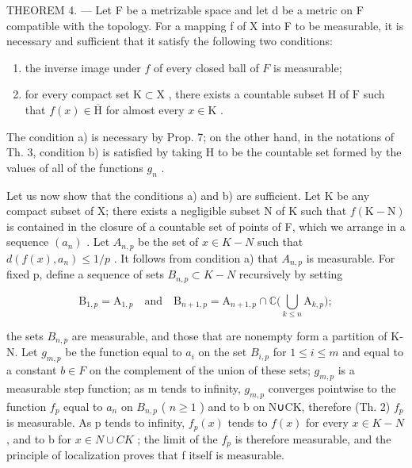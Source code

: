 THEOREM 4. --- Let F be a metrizable space and let d be a metric on F compatible with the topology. For a mapping f of X into F to be measurable, it is necessary and sufficient that it satisfy the following two conditions:

\begin{enumerate}
\def\labelenumi{\alph{enumi})}
\item
  the inverse image under \(f\) of every closed ball of \(F\) is measurable;
\item
  for every compact set \(\mathrm{K} \subset \mathrm{X}\) , there exists a countable subset \(\mathrm{H}\) of \(\mathrm{F}\) such that \(f(x) \in \overline{\mathrm{H}}\) for almost every \(x \in \mathrm{K}\) .
\end{enumerate}

The condition a) is necessary by Prop. 7; on the other hand, in the notations of Th. 3, condition b) is satisfied by taking H to be the countable set formed by the values of all of the functions \(g_{n}\) .

Let us now show that the conditions a) and b) are sufficient. Let K be any compact subset of X; there exists a negligible subset N of K such that \(f(\mathrm{K}-\mathrm{N})\) is contained in the closure of a countable set of points of F, which we arrange in a sequence \((a_{n})\) . Let \(A_{n,p}\) be the set of \(x \in K-N\) such that \(d(f(x), a_{n}) \leqslant 1/p\) . It follows from condition a) that \(A_{n,p}\) is measurable. For fixed p, define a sequence of sets \(B_{n,p} \subset K-N\) recursively by setting

\[
\mathrm{B} _ {1, p} = \mathrm{A} _ {1, p} \quad \text {and} \quad \mathrm{B} _ {n + 1, p} = \mathrm{A} _ {n + 1, p} \cap \mathbb {C} \Big (\bigcup_ {k \leqslant n} \mathrm{A} _ {k, p} \Big);
\]

the sets \(B_{n,p}\) are measurable, and those that are nonempty form a partition of K-N. Let \(g_{m,p}\) be the function equal to \(a_{i}\) on the set \(B_{i,p}\) for \(1 \leqslant i \leqslant m\) and equal to a constant \(b \in F\) on the complement of the union of these sets; \(g_{m,p}\) is a measurable step function; as m tends to infinity, \(g_{m,p}\) converges pointwise to the function \(f_{p}\) equal to \(a_{n}\) on \(B_{n,p}\) ( \(n \geqslant 1\) ) and to b on N∪CK, therefore (Th. 2) \(f_{p}\) is measurable. As p tends to infinity, \(f_{p}(x)\) tends to \(f(x)\) for every \(x \in K-N\) , and to b for \(x \in N \cup CK\) ; the limit of the \(f_{p}\) is therefore measurable, and the principle of localization proves that f itself is measurable.

